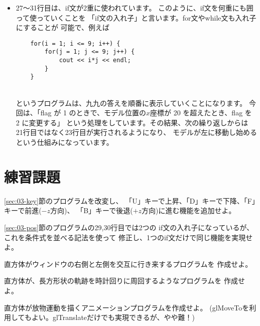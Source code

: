 \begin{itemize}
 \item 27〜31行目は、if文が2重に使われています。
	このように、if文を何重にも囲って使っていくことを
	「if文の入れ子」と言います。for文やwhile文も入れ子にすることが
	可能で、例えば \\
	\begin{screen}
	\begin{verbatim}
	for(i = 1; i <= 9; i++) {
	    for(j = 1; j <= 9; j++) {
	        cout << i*j << endl;
	    }
	}
	\end{verbatim}
	\end{screen} ~ \\
	というプログラムは、九九の答えを順番に表示していくことになります。
	今回は、「flag が 1 のときで、モデル位置の\(x\)座標が
	20 を超えたとき、flag を 2 に変更する」
	という処理をしています。その結果、次の繰り返しからは
	21行目ではなく23行目が実行されるようになり、
	モデルが左に移動し始めるという仕組みになっています。

\end{itemize}

\newpage
\section{練習課題} \label{sec:03-q}
\begin{description}
 \myitem \ref{sec:03-key}節のプログラムを改変し、
	「U」キーで上昇、「D」キーで下降、「F」キーで前進(\(-z\)方向)、
	「B」キーで後退(\(+z\)方向)に進む機能を追加せよ。

 \myitem \ref{sec:03-pos}節のプログラムの29,30行目では2つの
	if文の入れ子になっているが、これを条件式を並べる記法を使って
	修正し、1つのif文だけで同じ機能を実現せよ。

 \myitem 直方体がウィンドウの右側と左側を交互に行き来するプログラムを
	作成せよ。

 \myitem 直方体が、長方形状の軌跡を時計回りに周回するようなプログラムを
	作成せよ。

 \myitem 直方体が放物運動を描くアニメーションプログラムを作成せよ。
	(glMoveToを利用してもよい。glTranslateだけでも実現できるが、やや難！)

\end{description}
